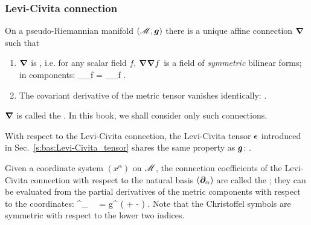 \subsubsection{Levi-Civita connection} \label{s:bas:Levi-Civita_connect}

On a pseudo-Riemannian manifold $(\mathscr{M},\bm{g})$ there is a unique affine connection
$\bm{\nabla}$ such that
\begin{enumerate}
\item $\bm{\nabla}$ is , i.e. for any scalar field $f$,
$\bm{\nabla}\bm{\nabla} f$ is a field of \emph{symmetric} bilinear forms; in components:
\be \label{e:bas:torsion-free}
  \nabla_\alpha\nabla_\beta f = \nabla_\beta\nabla_\alpha f .
\ee
\item The covariant derivative of the metric tensor vanishes identically:
\be \label{e:bas:nabla_g_zero}
   .
\ee
\end{enumerate}
$\bm{\nabla}$ is called the .
In this book, we shall consider only such connections.

With respect to the Levi-Civita connection, the Levi-Civita tensor $\bm{\epsilon}$ introduced
in Sec.~\ref{s:bas:Levi-Civita_tensor} shares the same property as $\bm{g}$:
\be \label{e:bas:nab_eps}
   .
\ee

Given a coordinate system $(x^\alpha)$ on $\mathscr{M}$, the connection coefficients of the
Levi-Civita connection with respect to the natural basis $(\bm{\partial}_\alpha)$
are called the ; they
can be evaluated
from the partial derivatives of the metric components with respect to the coordinates:
\be \label{e:bas:Christoffel}
  \Gamma^\gamma_{\ \ \alpha\beta} =  g^{\gamma\mu}
    \left(  + 
    -  \right) .
\ee
Note that the Christoffel symbols are symmetric with respect to the lower two indices.

